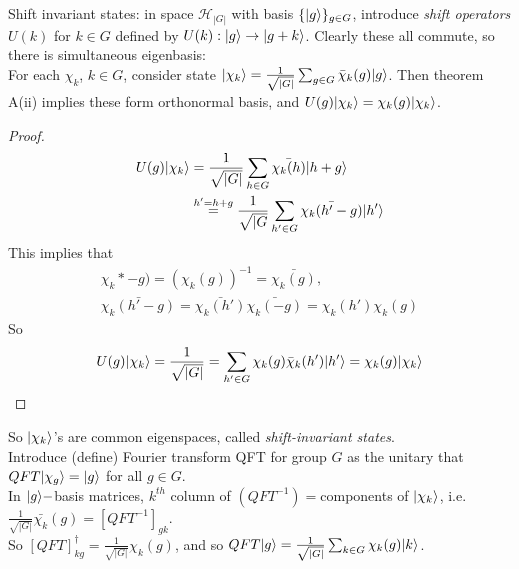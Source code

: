 \documentclass[a4paper]{article}
\begin{document}
Shift invariant states: in space $\mathcal{H}_{|G|}$ with basis $\{|g\rangle\}_{g \in G}$, introduce \emph{shift operators} $U(k)$ for $k \in G$ defined by $U(k): |g\rangle \to |g+k\rangle$. Clearly these all commute, so there is simultaneous eigenbasis:\\
For each $\chi_k$, $k\in G$, consider state $|\chi_k \rangle = \frac{1}{\sqrt{|G|}} \sum_{g \in G} \bar{\chi}_k (g)|g\rangle$. Then theorem A(ii) implies these form orthonormal basis, and $U(g) |\chi_k\rangle = \chi_k(g)|\chi_k\rangle$.
\begin{proof}
    \begin{equation*}
        \begin{aligned}
            U(g)|\chi_k\rangle &= \frac{1}{\sqrt{|G|}} \sum_{h \in G} \bar {\chi_k(h)} |h+g\rangle\\
            &\stackrel{h'=h+g}{=} \frac{1}{\sqrt{|G}} \sum_{h' \in G} \bar{\chi_k(h'-g)} |h' \rangle
        \end{aligned}
    \end{equation*}
    This implies that 
    \begin{equation*}
        \begin{aligned}
            \chi_k*-g) = (\chi_k(g))^{-1} = \bar{\chi_k(g)},\\
            \bar{\chi_k(h'-g)} = \bar{\chi_k(h')}\bar{\chi_k(-g)} = \chi_k(h')\chi_k(g)
        \end{aligned}
    \end{equation*}
    So
    \begin{equation*}
        \begin{aligned}
            U(g) | \chi_k \rangle = \frac{1}{\sqrt{|G|}} = \sum_{h' \in G} \chi_k(g) \bar{\chi}_k (h') | h' \rangle = \chi_k (g) | \chi_k \rangle
        \end{aligned}
    \end{equation*}
\end{proof}

So $|\chi_k \rangle$'s are common eigenspaces, called \emph{shift-invariant states}.\\
    Introduce (define) Fourier transform QFT for group $G$ as the unitary that $QFT|\chi_g\rangle = |g\rangle$ for all $g \in G$.\\
    In $|g\rangle-$basis matrices, $k^{th}$ column of $(QFT^{-1}) = $components of $|\chi_k\rangle$, i.e. $\frac{1}{\sqrt{|G|}} \bar{\chi_k}(g) = [QFT^{-1}]_{gk}$.\\
    So $[QFT]_{kg}^\dagger = \frac{1}{\sqrt{|G|}}\chi_k(g)$, and so $QFT|g\rangle = \frac{1}{\sqrt{|G|}} \sum_{k \in G} \chi_k (g) |k\rangle$.
\end{document}
